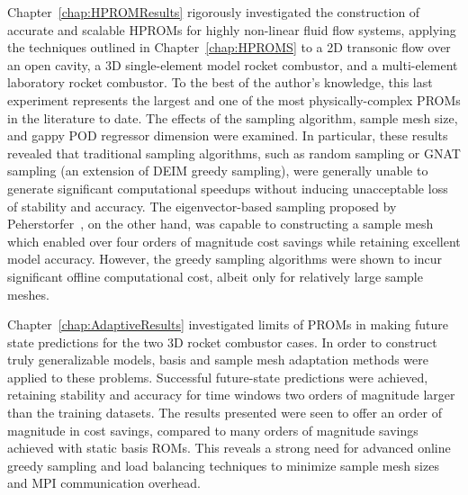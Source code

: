 Chapter~\ref{chap:HPROMResults} rigorously investigated the construction of accurate and scalable HPROMs for highly non-linear fluid flow systems, applying the techniques outlined in Chapter~\ref{chap:HPROMS} to a 2D transonic flow over an open cavity, a 3D single-element model rocket combustor, and a multi-element laboratory rocket combustor. To the best of the author's knowledge, this last experiment represents the largest and one of the most physically-complex PROMs in the literature to date. The effects of the sampling algorithm, sample mesh size, and gappy POD regressor dimension were examined. In particular, these results revealed that traditional sampling algorithms, such as random sampling or GNAT sampling (an extension of DEIM greedy sampling), were generally unable to generate significant computational speedups without inducing unacceptable loss of stability and accuracy. The eigenvector-based sampling proposed by Peherstorfer~\cite{Peherstorfer2020}, on the other hand, was capable to constructing a sample mesh which enabled over four orders of magnitude cost savings while retaining excellent model accuracy. However, the greedy sampling algorithms were shown to incur significant offline computational cost, albeit only for relatively large sample meshes.

Chapter~\ref{chap:AdaptiveResults} investigated limits of PROMs in making future state predictions for the two 3D rocket combustor cases. In order to construct truly generalizable models, basis and sample mesh adaptation methods were applied to these problems. Successful future-state predictions were achieved, retaining stability and accuracy for time windows two orders of magnitude  larger than the training datasets. The results presented were seen to offer an order of magnitude in cost savings, compared to many orders of magnitude savings achieved with static basis ROMs. This reveals a strong need for advanced online greedy sampling and load balancing techniques to minimize sample mesh sizes and MPI communication overhead.

